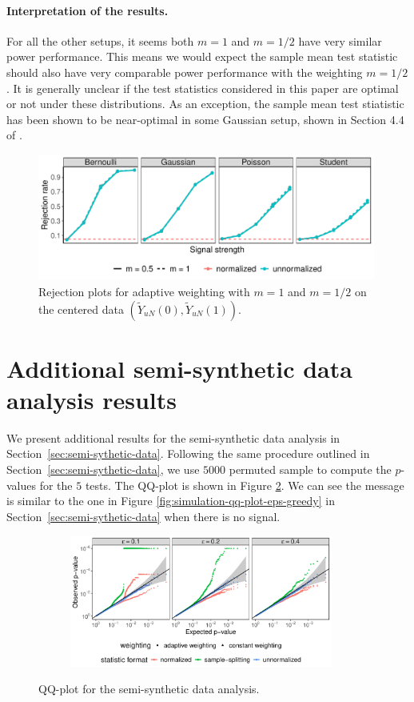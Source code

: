 \documentclass[12pt]{article}
\begin{document}
\paragraph{Interpretation of the results.}


For all the other setups, it seems both $m=1$ and $m=1/2$ have very similar power performance. This means we would expect the sample mean test statistic should also have very comparable power performance with the weighting $m=1/2$. It is generally unclear if the test statistics considered in this paper are optimal or not under these distributions. As an exception, the sample mean test stiatistic has been shown to be near-optimal in some Gaussian setup, shown in Section 4.4 of \citet{Hirano2023}. 

\begin{figure}[!ht]
	\centering
	\includegraphics[width=0.99\textwidth]{figures-and-tables/simulation/rejection_plot_power_comparison.pdf}
	\caption{Rejection plots for adaptive weighting with $m=1$ and $m=1/2$ on the centered data $(\tilde Y_{uN}(0),\tilde Y_{uN}(1))$.}
	\label{fig:power_comparison}
\end{figure}

\clearpage

\section{Additional semi-synthetic data analysis results}\label{sec:additional_semi_synthetic}

We present additional results for the semi-synthetic data analysis in Section~\ref{sec:semi-sythetic-data}. Following the same procedure outlined in Section~\ref{sec:semi-sythetic-data}, we use $5000$ permuted sample to compute the $p$-values for the $5$ tests. The QQ-plot is shown in Figure \ref{fig:semi-synthetic-qq-plot}. We can see the message is similar to the one in Figure \ref{fig:simulation-qq-plot-eps-greedy} in Section~\ref{sec:semi-sythetic-data} when there is no signal.

\begin{figure}[!ht]
	\centering
	\begin{subfigure}{\textwidth}
		\centering
		\includegraphics[width=0.95\textwidth]{figures-and-tables/realdata/qq_plot.pdf}
	\end{subfigure}
	\caption{QQ-plot for the semi-synthetic data analysis.}
	\label{fig:semi-synthetic-qq-plot}
\end{figure}
\end{document}
